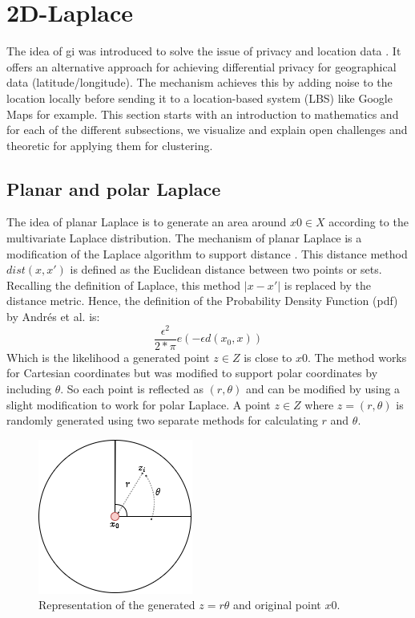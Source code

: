
\section{2D-Laplace}
The idea of \gls{gi} was introduced to solve the issue of privacy and location data \citep{DBLP:journals/corr/abs-1212-1984}.
It offers an alternative approach for achieving differential privacy for geographical data (latitude/longitude).
The mechanism achieves this by adding noise to the location locally before sending it to a location-based system (LBS) like Google Maps for example.
This section starts with an introduction to mathematics and for each of the different subsections, we visualize and explain open challenges and theoretic for applying them for clustering.
\subsection{Planar and polar Laplace}
The idea of planar Laplace is to generate an area around $x0 \in X$ according to the multivariate Laplace distribution.
The mechanism of planar Laplace is a modification of the Laplace algorithm to support distance \citep{DBLP:journals/corr/abs-1212-1984}.
This distance method $dist(x, x')$ is defined as the Euclidean distance between two points or sets.
Recalling the definition of Laplace, this method $|x-x'|$ is replaced by the distance metric.
Hence, the definition of the Probability Density Function (pdf) by Andrés et al. is:
\begin{equation}
  \frac{\epsilon^2}{2*\pi}e(-\epsilon d(x_0, x))
\end{equation}
Which is the likelihood a generated point $z \in Z$ is close to $x0$.
The method works for Cartesian coordinates but was modified to support polar coordinates by including $\theta$.
So each point is reflected as $(r, \theta)$ and can be modified by using a slight modification to work for polar Laplace.
A point $z \in Z$ where $z = (r, \theta)$ is randomly generated using two separate methods for calculating $r$ and $\theta$.
\begin{figure}[h]
  \includegraphics[scale=0.6]{TheorethicalFramework/ND-Laplace/Images/polar-laplace.png}
  \centering
  \caption{Representation of the generated $z = {r \theta}$ and original point $x0$.}
  \label{figure:parea}
\end{figure}

